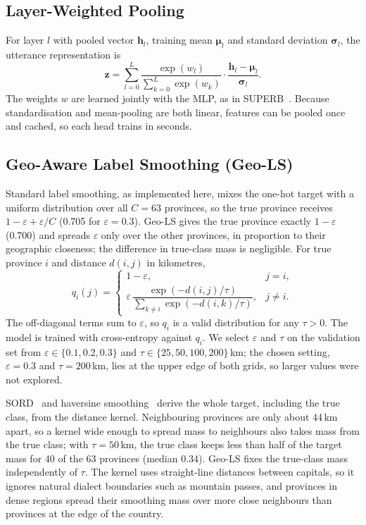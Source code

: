 \documentclass[conference]{IEEEtran}
\begin{document}
\subsection{Layer-Weighted Pooling}
For layer $l$ with pooled vector $\mathbf{h}_l$, training mean $\boldsymbol{\mu}_l$ and standard deviation $\boldsymbol{\sigma}_l$, the utterance representation is
\begin{equation}
\mathbf{z} = \sum_{l=0}^{L} \frac{\exp(w_l)}{\sum_{k=0}^{L}\exp(w_k)} \cdot \frac{\mathbf{h}_l - \boldsymbol{\mu}_l}{\boldsymbol{\sigma}_l}.
\label{eq:wsum}
\end{equation}
The weights $w$ are learned jointly with the MLP, as in SUPERB~\cite{superb}. Because standardisation and mean-pooling are both linear, features can be pooled once and cached, so each head trains in seconds.

\subsection{Geo-Aware Label Smoothing (Geo-LS)}
Standard label smoothing, as implemented here, mixes the one-hot target with a uniform distribution over all $C = 63$ provinces, so the true province receives $1-\varepsilon+\varepsilon/C$ (0.705 for $\varepsilon = 0.3$). Geo-LS gives the true province exactly $1-\varepsilon$ (0.700) and spreads $\varepsilon$ only over the other provinces, in proportion to their geographic closeness; the difference in true-class mass is negligible. For true province $i$ and distance $d(i,j)$ in kilometres,
\begin{equation}
q_i(j) =
\begin{cases}
1-\varepsilon, & j = i,\\[2pt]
\varepsilon\,\dfrac{\exp\!\left(-d(i,j)/\tau\right)}{\sum_{k\neq i}\exp\!\left(-d(i,k)/\tau\right)}, & j \neq i.
\end{cases}
\label{eq:geols}
\end{equation}
The off-diagonal terms sum to $\varepsilon$, so $q_i$ is a valid distribution for any $\tau > 0$. The model is trained with cross-entropy against $q_i$. We select $\varepsilon$ and $\tau$ on the validation set from $\varepsilon \in \{0.1, 0.2, 0.3\}$ and $\tau \in \{25, 50, 100, 200\}$\,km; the chosen setting, $\varepsilon = 0.3$ and $\tau = 200$\,km, lies at the upper edge of both grids, so larger values were not explored.

SORD~\cite{sord} and haversine smoothing~\cite{pigeon} derive the whole target, including the true class, from the distance kernel. Neighbouring provinces are only about 44\,km apart, so a kernel wide enough to spread mass to neighbours also takes mass from the true class; with $\tau = 50$\,km, the true class keeps less than half of the target mass for 40 of the 63 provinces (median 0.34). Geo-LS fixes the true-class mass independently of $\tau$. The kernel uses straight-line distances between capitals, so it ignores natural dialect boundaries such as mountain passes, and provinces in dense regions spread their smoothing mass over more close neighbours than provinces at the edge of the country.
\end{document}
